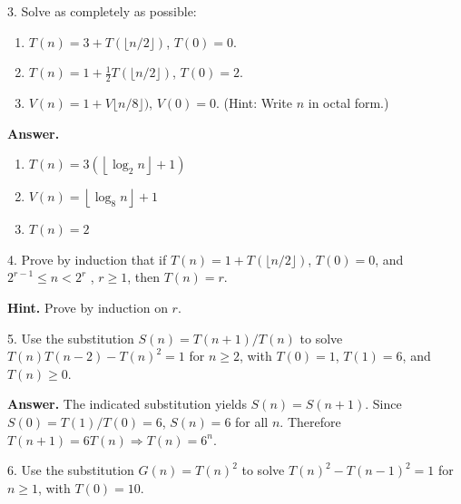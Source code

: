 \documentclass[10pt,]{book}
\theoremstyle{plain}
\theoremstyle{definition}
\theoremstyle{definition}
\theoremstyle{definition}
\theoremstyle{definition}
\numberwithin{equation}{section}
\begin{document}
\begin{exercisegroup}
\item[3.]\hypertarget{exercise-31}{}Solve as completely as possible:%
\par
\leavevmode%
\begin{enumerate}[label=\alph*]
\item\hypertarget{li-100}{}\(T(n) = 3 + T(\lfloor n/2\rfloor )\), \(T(0) = 0\).%
\item\hypertarget{li-101}{}\(T(n) = 1 + \frac{1}{2}T(\lfloor n/2\rfloor )\), { }\(T(0) = 2\).%
\item\hypertarget{li-102}{} \(V(n) = 1 + V\lfloor n/8\rfloor )\), \(V(0) = 0\). (Hint: Write \(n\) in octal form.)%
\end{enumerate}
%
\par\smallskip
\par\smallskip
\noindent\textbf{Answer.}\hypertarget{answer-16}{}\quad
\leavevmode%
\begin{enumerate}[label=\alph*]
\item\hypertarget{li-103}{}  \(T(n)=3\left(\left\lfloor \log _2n\right\rfloor +1\right)\) %
\item\hypertarget{li-104}{} \(V(n)=\left\lfloor \log _8n\right\rfloor +1\)%
\item\hypertarget{li-105}{}\(T(n)=2\)%
\end{enumerate}
%
\item[4.]\hypertarget{exercise-32}{} Prove by induction that if \(T(n)= 1 + T (\lfloor n/2 \rfloor )\), \(T(0) = 0\), and \(2^{r-1}\leq n < 2^r\) , \(r \geq  1\), then \(T(n) = r\).
%
\par\smallskip
\par\smallskip
\noindent\textbf{Hint.}\hypertarget{hint-1}{}\quad
Prove by induction on \(r\).%
\item[5.]\hypertarget{exercise-33}{} Use the substitution \(S(n) = T(n + 1)/T(n)\) to solve
\(T(n)T(n-2)-T(n)^2=1\) for \(n \geq  2\), with \(T(0) = 1\), \(T(1) = 6\), and\(T(n) \geq  0\).%
\par\smallskip
\par\smallskip
\noindent\textbf{Answer.}\hypertarget{answer-17}{}\quad
 The indicated substitution yields \(S(n)=S(n+1)\). Since \(S(0)=T(1)/T(0)=6\), \(S(n)=6\) for all \(n\). Therefore \(T(n+1)=6T(n)\Rightarrow T(n)=6^n\).%
\item[6.]\hypertarget{exercise-34}{} Use the substitution \(G(n) =T(n)^2\) { }to solve
\(T(n)^2-T(n-1)^2=1\) for \(n \geq  1\), with \(T(0) = 10\).%
\par\smallskip

\end{exercisegroup}
\end{document}
